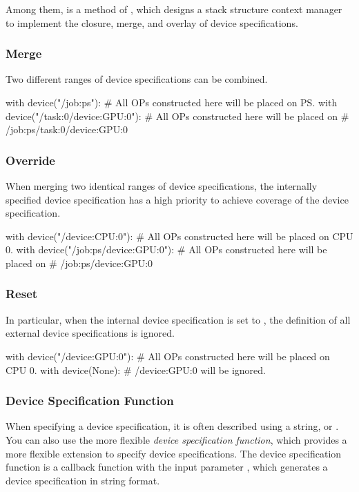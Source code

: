 \begin{content}
Among them,  is a method of , which designs a stack structure context manager to implement the closure, merge, and overlay of device specifications.


\subsubsection{Merge}
Two different ranges of device specifications can be combined.

\begin{leftbar}
\begin{python}
with device("/job:ps"):
  # All OPs constructed here will be placed on PS.
  with device("/task:0/device:GPU:0"):
    # All OPs constructed here will be placed on
    # /job:ps/task:0/device:GPU:0
\end{python}
\end{leftbar}


\subsubsection{Override}
When merging two identical ranges of device specifications, the internally specified device specification has a high priority to achieve coverage of the device specification.

\begin{leftbar}
\begin{python}
with device("/device:CPU:0"):
  # All OPs constructed here will be placed on CPU 0.
  with device("/job:ps/device:GPU:0"):
    # All OPs constructed here will be placed on
    # /job:ps/device:GPU:0
\end{python}
\end{leftbar}


\subsubsection{Reset}
In particular, when the internal device specification is set to , the definition of all external device specifications is ignored.

\begin{leftbar}
\begin{python}
with device("/device:GPU:0"):
  # All OPs constructed here will be placed on CPU 0.
  with device(None):
    # /device:GPU:0 will be ignored.
\end{python}
\end{leftbar}


\subsubsection{Device Specification Function}
When specifying a device specification, it is often described using a string, or . You can also use the more flexible \emph{device specification function}, which provides a more flexible extension to specify device specifications. The device specification function is a callback function with the input parameter , which generates a device specification in string format.


\end{content}
